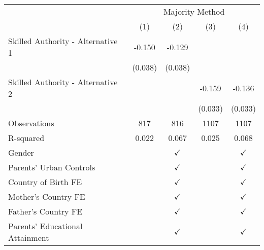\documentclass[]{article}
\begin{document}
\begin{tabular}{l*{4}{c}}
\hline\hline
                &\multicolumn{4}{c}{Majority Method}    \\\cmidrule(lr){2-5}
                &\multicolumn{1}{c}{(1)}&\multicolumn{1}{c}{(2)}&\multicolumn{1}{c}{(3)}&\multicolumn{1}{c}{(4)}\\
\hline
Skilled Authority - Alternative 1&   -0.150&   -0.129&         &         \\
                &  (0.038)&  (0.038)&         &         \\
[1em]
Skilled Authority - Alternative 2&         &         &   -0.159&   -0.136\\
                &         &         &  (0.033)&  (0.033)\\
\hline
Observations    &  817&  816& 1107& 1107\\
R-squared       &    0.022&    0.067&    0.025&    0.068\\
\hline
Gender          &         &$\checkmark$&         &$\checkmark$\\
Parents' Urban Controls&         &$\checkmark$&         &$\checkmark$\\
Country of Birth FE&         &$\checkmark$&         &$\checkmark$\\
Mother's Country FE&         &$\checkmark$&         &$\checkmark$\\
Father's Country FE&         &$\checkmark$&         &$\checkmark$\\
Parents' Educational Attainment&         &$\checkmark$&         &$\checkmark$\\
\hline\hline        
\end{tabular}
\\
\end{document}
